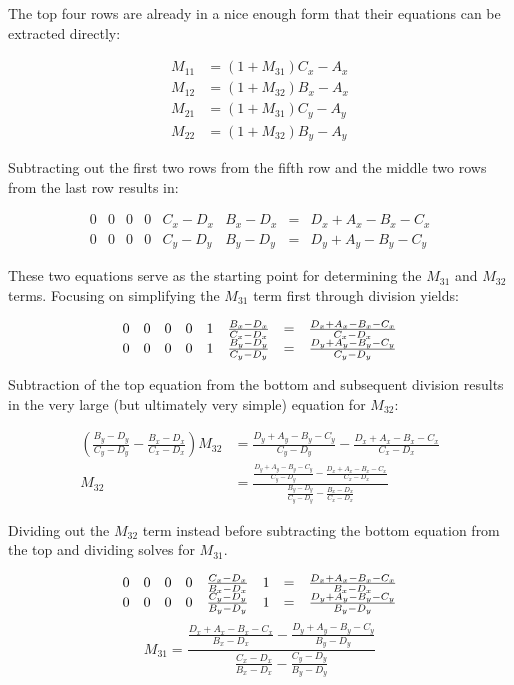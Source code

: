 \documentclass[letterpaper, 11pt]{article}
\begin{document}
\begin{enumerate}
The top four rows are already in a nice enough form that their equations
can be extracted directly:

\begin{align}
M_{11} &= (1 + M_{31})C_x - A_x \\
M_{12} &= (1 + M_{32})B_x - A_x \\
M_{21} &= (1 + M_{31})C_y - A_y \\
M_{22} &= (1 + M_{32})B_y - A_y
\end{align}

Subtracting out the first two rows from the fifth row and the middle two rows from the last 
row results in:

\[
\begin{array}{cccccccc}
0 & 0 & 0 & 0 & C_x - D_x & B_x - D_x & = & D_x + A_x - B_x - C_x \\
0 & 0 & 0 & 0 & C_y - D_y & B_y - D_y & = & D_y + A_y - B_y - C_y
\end{array}
\]

These two equations serve as the starting point for determining
the \(M_{31}\) and \(M_{32}\) terms. Focusing on simplifying the \(M_{31}\) term first
through division yields:

\[
\begin{array}{cccccccc}
0 & 0 & 0 & 0 & 1 & {B_x - D_x}\over{C_x - D_x} & = & {D_x + A_x - B_x - C_x}\over{C_x - D_x} \\
0 & 0 & 0 & 0 & 1 & {B_y - D_y}\over{C_y - D_y} & = & {D_y + A_y - B_y - C_y}\over{C_y - D_y}
\end{array}
\]

Subtraction of the top equation from the bottom and subsequent division results
in the very large (but ultimately very simple) equation for \(M_{32}\):

\begin{align}
\left( { \frac{B_y - D_y}{C_y - D_y} - \frac{B_x - D_x}{C_x - D_x} } \right) M_{32} &= \frac{D_y + A_y - B_y - C_y}{C_y - D_y} - \frac{D_x + A_x - B_x - C_x}{C_x - D_x} \\
M_{32} &= \frac{\frac{D_y + A_y - B_y - C_y}{C_y - D_y} - \frac{D_x + A_x - B_x - C_x}{C_x - D_x}}{\frac{B_y - D_y}{C_y - D_y} - \frac{B_x - D_x}{C_x - D_x}}    
\end{align}

Dividing out the \(M_{32}\) term instead before subtracting the bottom
equation from the top and dividing solves for \(M_{31}\).

\[
\begin{array}{cccccccc}
0 & 0 & 0 & 0 & {C_x - D_x}\over{B_x - D_x} & 1 & = & {D_x + A_x - B_x - C_x}\over{B_x - D_x} \\0 & 0 & 0 & 0 & {C_y - D_y}\over{B_y - D_y} & 1 & = & {D_y + A_y - B_y - C_y}\over{B_y - D_y}
\end{array}
\]$$ M_{31} = \frac{\frac{D_x + A_x - B_x - C_x}{B_x - D_x} - \frac{D_y + A_y - B_y - C_y}{B_y - D_y}}{\frac{C_x - D_x}{B_x - D_x} - \frac{C_y - D_y}{B_y - D_y}} 
 $$


\end{enumerate}
\end{document}
